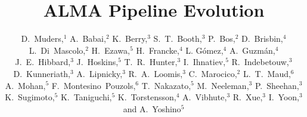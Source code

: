 \documentclass[11pt,twoside]{article}
\begin{document}
\title{ALMA Pipeline Evolution}

\author{D.~Muders,$^1$
A.~Babai,$^2$
K.~Berry,$^3$
S.~T.~Booth,$^3$
P.~Bos,$^2$
D.~Brisbin,$^4$
L.~Di~Mascolo,$^2$
H.~Ezawa,$^5$
H.~Francke,$^4$
L. G\'omez,$^4$
A.~Guzm\'an,$^4$
J.~E.~Hibbard,$^3$
J.~Hoskins,$^5$
T.~R.~Hunter,$^3$
I.~Ihnatiev,$^5$
R.~Indebetouw,$^3$
D.~Kunneriath,$^3$
A.~Lipnicky,$^3$
R.~A.~Loomis,$^3$
C.~Marocico,$^2$
L.~T.~Maud,$^6$
A.~Mohan,$^5$
F.~Montesino~Pouzols,$^6$
T.~Nakazato,$^5$
M.~Neeleman,$^3$
P.~Sheehan,$^3$
K.~Sugimoto,$^5$
K.~Taniguchi,$^5$
K.~Torstensson,$^4$
A.~Vibhute,$^3$
R.~Xue,$^3$
I.~Yoon,$^3$
and
A.~Yoshino$^5$}
\end{document}
